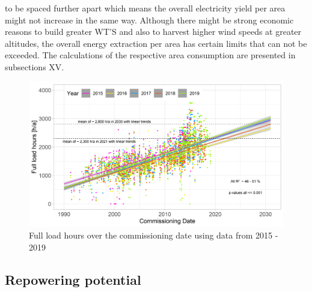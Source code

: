 \documentclass[a4paper,11pt]{article}
\begin{document}
to be spaced further apart which means the overall electricity yield per area might not increase in the same way. Although there might be strong economic reasons to build greater WT'S and also to harvest higher wind speeds at greater altitudes, the overall energy extraction per area has certain limits that can not be exceeded. The calculations of the respective area consumption are presented in subsections XV.
\begin{figure}[H]

{\centering \includegraphics[width=1\linewidth]{data/Amprion/results_of_analysis/flh} 

}

\caption{Full load hours over the commissioning date using data from 2015 - 2019}\label{fig:full}
\end{figure}
\hypertarget{repowering-potential}{%
\subsection{Repowering potential}\label{repowering-potential}}
\end{document}
